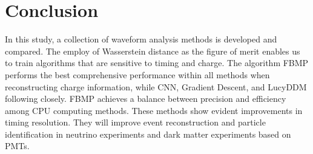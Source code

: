 \section{Conclusion} %
\label{sec:conclusion}

In this study, a collection of waveform analysis methods is developed and compared. The employ of Wasserstein distance as the figure of merit enables us to train algorithms that are sensitive to timing and charge. The algorithm FBMP performs the best comprehensive performance within all methods when reconstructing charge information, while CNN, Gradient Descent, and LucyDDM following closely. FBMP achieves a balance between precision and efficiency among CPU computing methods. These methods show evident improvements in timing resolution. They will improve event reconstruction and particle identification in neutrino experiments and dark matter experiments based on PMTs. 

